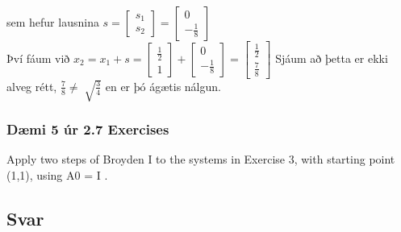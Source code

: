 \documentclass[11pt]{article}
\begin{document}
sem hefur lausnina $s=\begin{bmatrix}
s_1\\s_2
\end{bmatrix}= \begin{bmatrix}
0\\-\frac 18
\end{bmatrix}$\\
Því fáum við $x_2 = x_1 + s = \begin{bmatrix}
\frac 12\\1
\end{bmatrix}
+ \begin{bmatrix}
0\\-\frac 18
\end{bmatrix}
= \begin{bmatrix}
\frac 12\\ \frac 78
\end{bmatrix}$
Sjáum að þetta er ekki alveg rétt, $\frac 78 \neq \sqrt[]{\frac 34}$ en er þó ágætis nálgun.




\subsubsection*{Dæmi 5 úr 2.7 Exercises}
Apply two steps of Broyden I to the systems in Exercise 3, with starting point (1,1), using
A0 = I .
\subsection*{Svar}
\end{document}

